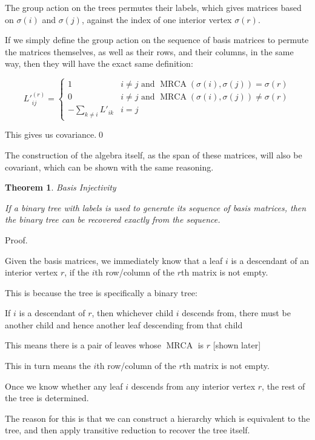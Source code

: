 \documentclass[10pt,a4paper]{report}
\DeclareMathOperator{\MRCA}{MRCA}
\newtheorem{theorem}{Theorem}
\begin{document}
The group action on the trees permutes their labels, which gives matrices based on $\sigma(i)$ and $\sigma(j)$, against the index of one interior vertex $\sigma(r)$.

If we simply define the group action on the sequence of basis matrices to permute the matrices themselves, as well as their rows, and their columns, in the same way, then they will have the exact same definition:

\[ L\prime_{ij}^(r) = \begin{cases}
	1 & i \neq j \textrm{ and } \MRCA(\sigma(i), \sigma(j)) = \sigma(r)\\
	0 & i \neq j \textrm{ and } \MRCA(\sigma(i), \sigma(j)) \neq \sigma(r)\\
	-\sum_{k \neq i} L\prime_{ik} & i = j
\end{cases} \]


This gives us covariance.\qed

The construction of the algebra itself, as the span of these matrices, will also be covariant, which can be shown with the same reasoning.

\begin{theorem} Basis Injectivity

	If a binary tree with labels is used to generate its sequence of basis matrices, then the binary tree can be recovered exactly from the sequence.
\end{theorem}

Proof.

Given the basis matrices, we immediately know that a leaf $i$ is a descendant of an interior vertex $r$, if the $i$th row/column of the $r$th matrix is not empty.

This is because the tree is specifically a binary tree:

If $i$ is a descendant of $r$, then whichever child $i$ descends from, there must be another child and hence another leaf descending from that child

This means there is a pair of leaves whose $\MRCA$ is $r$ [shown later]

This in turn means the $i$th row/column of the $r$th matrix is not empty.

Once we know whether any leaf $i$ descends from any interior vertex $r$, the rest of the tree is determined.

The reason for this is that we can construct a hierarchy which is equivalent to the tree, and then apply transitive reduction to recover the tree itself.
\end{document}
